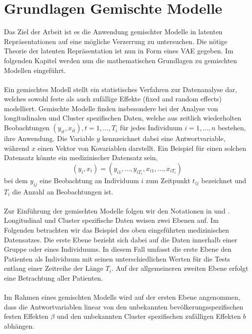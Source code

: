 \documentclass[%
thesis=student,%
coverpage=false,%
titlepage=false,%
headmarks=true, %
german,%
font=libertine, %
math=newpxtx, %
BCOR=5mm,%
coverBCOR=11mm%
]{tumbook}
\theoremstyle{break}
\begin{document}

\section{Grundlagen Gemischte Modelle}
Das Ziel der Arbeit ist es die Anwendung gemischter Modelle in latenten Repräsentationen auf eine mögliche Verzerrung zu untersuchen. Die nötige Theorie der latenten Repräsentation ist nun in Form eines VAE gegeben. Im folgenden Kapitel werden nun die mathematischen Grundlagen zu gemischten Modellen eingeführt.\\
\\
Ein gemischtes Modell stellt ein statistisches Verfahren zur Datenanalyse dar, welches sowohl feste als auch zufällige Effekte (fixed and random effects) modelliert. Gemischte Modelle finden insbesondere bei der Analyse von longitudinalen und Cluster spezifischen Daten, welche aus zeitlich wiederholten Beobachtungen $(y_{it}, x_{it}), t = 1,..., T_i$ für jedes Individuum $ i = 1,...,n$ bestehen, ihre Anwendung. Die Variable $y$ kennzeichnet dabei eine Antwortvariable, während $x$ einen Vektor von Kovariablen darstellt. Ein Beispiel für einen solchen Datensatz könnte ein medizinischer Datensatz sein,\\
$$(y_i,x_i)= (y_{i1},...,y_{iT_i},x_{i1},...,x_{iT_i})$$
bei dem $y_{ij}$ eine Beobachtung an Individuum $i$ zum Zeitpunkt $t_{ij}$ bezeichnet und $T_i$ die Anzahl an Beobachtungen ist.\\
\\
Zur Einführung der gemischten Modelle folgen wir den Notationen in \cite{fahrmeir-2001-multivariate} und \cite{fahrmeir-2011-regression}.
Longitudinal und Cluster spezifische Daten weisen zwei Ebenen auf. Im Folgenden betrachten wir das Beispiel des oben eingeführten medizinischen Datensatzes. Die erste Ebene bezieht sich dabei auf die Daten innerhalb einer Gruppe oder eines Individuums. In diesem Fall umfasst die erste Ebene den Patienten als Individuum mit seinen unterschiedlichen Werten für die Tests entlang einer Zeitreihe der Länge $T_i$. Auf der allgemeineren zweiten Ebene erfolgt eine Betrachtung aller Patienten. \\
\\
Im Rahmen eines gemischten Modells wird auf der ersten Ebene angenommen, dass die Antwortvariablen linear von den unbekannten bevölkerungsspezifischen festen Effekten $\beta$ und den unbekannten Cluster spezifischen zufälligen Effekten $b$ abhängen.\\
\end{document}

